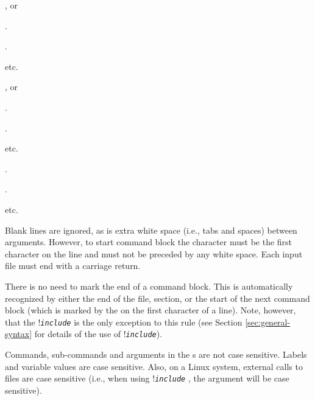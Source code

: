 \begin{multicols}{3}
	\begin{description}
		\item {}, or
		\item {} 
		\item {} 
		\item .
		\item .
		\item etc.
		\item {} , or
		\item {} 
		\item {} 
		\item .
		\item .
		\item etc.
		\item {} 
		\item {} 
		\item {} 
		\item .
		\item .
		\item etc.
		\end{description}
	\end{multicols}


Blank lines are ignored, as is extra white space (i.e., tabs and spaces) between arguments. However, to start command block the \command{} character must be the first character on the line and must not be preceded by any white space. Each input file must end with a carriage return.

There is no need to mark the end of a command block. This is automatically recognized by either the end of the file, section, or the start of the next command block (which is marked by the \command{} on the first character of a line). Note, however, that the !\texttt{\emph{include}} is the only exception to this rule (see Section \ref{sec:general-syntax} for details of the use of !\texttt{\emph{include}}). 

Commands, sub-commands and arguments in the \config s are not case sensitive. Labels and variable values are case sensitive. Also, on a Linux system, external calls to files are case sensitive (i.e., when using !\texttt{\emph{include}} , the argument  will be case sensitive). 


